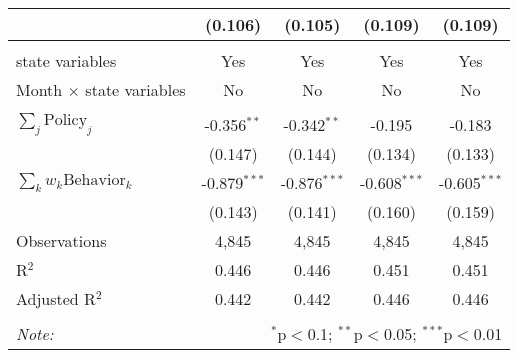 \begin{tabular}{@{\extracolsep{1pt}}lcccc}
  & (0.106) & (0.105) & (0.109) & (0.109) \\ 
 \hline \\[-1.8ex] 
state variables & Yes & Yes & Yes & Yes \\ 
Month $\times$ state variables & No & No & No & No \\ 
\hline \\[-1.8ex] 
$\sum_j \mathrm{Policy}_j$ & -0.356$^{**}$ & -0.342$^{**}$ & -0.195 & -0.183 \\ 
 & (0.147) & (0.144) & (0.134) & (0.133) \\ 
$\sum_k w_k \mathrm{Behavior}_k$ & -0.879$^{***}$ & -0.876$^{***}$ & -0.608$^{***}$ & -0.605$^{***}$ \\ 
 & (0.143) & (0.141) & (0.160) & (0.159) \\ 
Observations & 4,845 & 4,845 & 4,845 & 4,845 \\ 
R$^{2}$ & 0.446 & 0.446 & 0.451 & 0.451 \\ 
Adjusted R$^{2}$ & 0.442 & 0.442 & 0.446 & 0.446 \\ 
\hline 
\hline \\[-1.8ex] 
\textit{Note:}  & \multicolumn{4}{r}{$^{*}$p$<$0.1; $^{**}$p$<$0.05; $^{***}$p$<$0.01} \\ 
\end{tabular} 